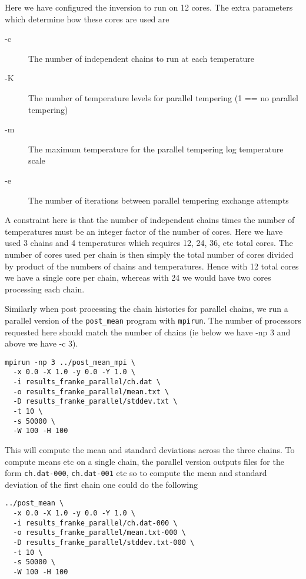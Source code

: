 \documentclass[a4paper,12pt]{article}
\begin{document}
Here we have configured the inversion to run on 12 cores. The extra parameters which
determine how these cores are used are

\begin{description}
\item[-c] The number of independent chains to run at each temperature
\item[-K] The number of temperature levels for parallel tempering (1 == no parallel tempering)
\item[-m] The maximum temperature for the parallel tempering log temperature scale
\item[-e] The number of iterations between parallel tempering exchange attempts
\end{description}

A constraint here is that the number of independent chains times the
number of temperatures must be an integer factor of the number of
cores. Here we have used 3 chains and 4 temperatures which requires
12, 24, 36, etc total cores. The number of cores used per chain is
then simply the total number of cores divided by product of the
numbers of chains and temperatures. Hence with 12 total cores we have
a single core per chain, whereas with 24 we would have two cores
processing each chain.

Similarly when post processing the chain histories for parallel chains,
we run a parallel version of the \texttt{post\_mean} program with
\texttt{mpirun}. The number of processors requested here should match
the number of chains (ie below we have -np 3 and above we have -c 3).

\begin{verbatim}
mpirun -np 3 ../post_mean_mpi \
  -x 0.0 -X 1.0 -y 0.0 -Y 1.0 \
  -i results_franke_parallel/ch.dat \
  -o results_franke_parallel/mean.txt \
  -D results_franke_parallel/stddev.txt \
  -t 10 \
  -s 50000 \
  -W 100 -H 100
\end{verbatim}

This will compute the mean and standard deviations across the three
chains. To compute means etc on a single chain, the parallel version
outputs files for the form \texttt{ch.dat-000}, \texttt{ch.dat-001} etc
so to compute the mean and standard deviation of the first chain one could do the
following

\begin{verbatim}
../post_mean \
  -x 0.0 -X 1.0 -y 0.0 -Y 1.0 \
  -i results_franke_parallel/ch.dat-000 \
  -o results_franke_parallel/mean.txt-000 \
  -D results_franke_parallel/stddev.txt-000 \
  -t 10 \
  -s 50000 \
  -W 100 -H 100
\end{verbatim}
\end{document}
